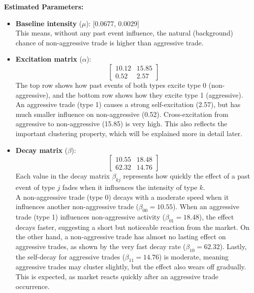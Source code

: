 \vspace{1em}
\noindent\textbf{Estimated Parameters:}
\begin{itemize}
    \item \textbf{Baseline intensity} (\( \mu \)): [0.0677, 0.0029] \\
    This means, without any past event influence, the natural (background) chance of non-aggressive trade is higher than aggressive trade.
    
    \item \textbf{Excitation matrix} (\( \alpha \)): 
    \[
    \begin{bmatrix}
    10.12 & 15.85 \\
    0.52 & 2.57
    \end{bmatrix}
    \]
    The top row shows how past events of both types excite type 0 (non-aggressive), and the bottom row shows how they excite type 1 (aggressive). An aggressive trade (type 1) causes a strong self-excitation (2.57), but has much smaller influence on non-aggressive (0.52). Cross-excitation from aggressive to non-aggressive (15.85) is very high. This also reflects the important clustering property, which will be explained more in detail later.

    \item \textbf{Decay matrix} (\( \beta \)): 
    \[
    \begin{bmatrix}
    10.55 & 18.48 \\
    62.32 & 14.76
    \end{bmatrix}
    \]
    Each value in the decay matrix \( \beta_{kj} \) represents how quickly the effect of a past event of type \( j \) fades when it influences the intensity of type \( k \).\\
    A non-aggressive trade (type 0) decays with a moderate speed when it influences another non-aggressive trade (\( \beta_{00} = 10.55 \)). When an aggressive trade (type 1) influences non-aggressive activity (\( \beta_{01} = 18.48 \)), the effect decays faster, suggesting a short but noticeable reaction from the market. On the other hand, a non-aggressive trade has almost no lasting effect on aggressive trades, as shown by the very fast decay rate (\( \beta_{10} = 62.32 \)). Lastly, the self-decay for aggressive trades (\( \beta_{11} = 14.76 \)) is moderate, meaning aggressive trades may cluster slightly, but the effect also wears off gradually. This is expected, as market reacts quickly after an aggressive trade occurrence.
\end{itemize}

